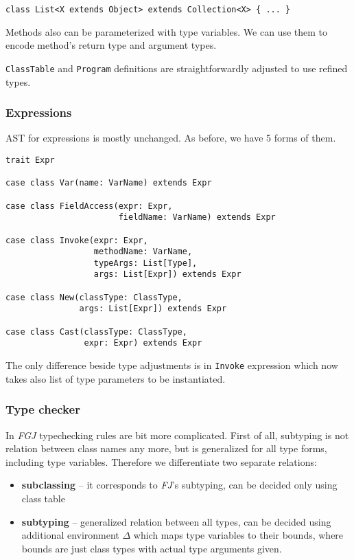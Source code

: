 \documentclass{article}[12pt]
\begin{document}
\begin{verbatim}
class List<X extends Object> extends Collection<X> { ... }
\end{verbatim}

Methods also can be parameterized with type variables. We can use
them to encode method's return type and argument types.

\texttt{ClassTable} and \texttt{Program} definitions are
straightforwardly adjusted to use refined types.

\subsubsection{Expressions}

AST for expressions is mostly unchanged. As before, we have 5
forms of them.

\begin{verbatim}
trait Expr

case class Var(name: VarName) extends Expr

case class FieldAccess(expr: Expr,
                       fieldName: VarName) extends Expr

case class Invoke(expr: Expr,
                  methodName: VarName,
                  typeArgs: List[Type],
                  args: List[Expr]) extends Expr

case class New(classType: ClassType,
               args: List[Expr]) extends Expr

case class Cast(classType: ClassType,
                expr: Expr) extends Expr
\end{verbatim}

The only difference beside type adjustments is in \texttt{Invoke}
expression which now takes also list of type parameters to be
instantiated.

\subsubsection{Type checker}

In \emph{FGJ} typechecking rules are bit more complicated. First
of all, subtyping is not relation between class names any more,
but is generalized for all type forms, including type variables.
Therefore we differentiate two separate relations:

\begin{itemize}
\item{\textbf{subclassing}} -- it corresponds to \emph{FJ}'s
  subtyping, can be decided only using class table
\item{\textbf{subtyping}} -- generalized relation between all
  types, can be decided using additional environment $\Delta$
  which maps type variables to their bounds, where bounds are
  just class types with actual type arguments given.
\end{itemize}
\end{document}
